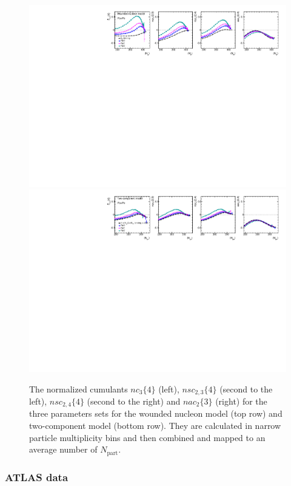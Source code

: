 \begin{figure}[H]
\centering
\includegraphics[width=.95\linewidth]{figs/chapter_centfluc/Glauber_others_Nw.pdf}
\includegraphics[width=.95\linewidth]{figs/chapter_centfluc/Glauber_others_Nan.pdf}
\caption{The normalized cumulants $nc_3\{4\}$ (left), $nsc_{2,3}\{4\}$ (second to the left), $nsc_{2,4}\{4\}$ (second to the right) and $nac_2\{3\}$ (right) for the three parameters sets for the wounded nucleon model (top row) and two-component model (bottom row). They are calculated in narrow particle multiplicity bins and then combined and mapped to an average number of $N_\text{part}$.}
\label{fig:centfluc_Glauber_others}
\end{figure}



\subsubsection{ATLAS data}
\label{sec:cent_atlas_data}

